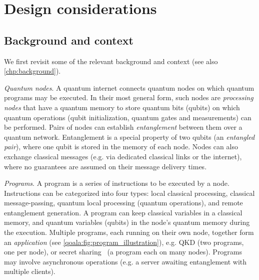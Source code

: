 \section{Design considerations}
\label{qoala:sec:design_considerations}

\subsection{Background and context}
\label{qoala:sec:background_context}

We first revisit some of the relevant background and context (see also \cref{chp:background}).

\textit{Quantum nodes}.
A quantum internet connects quantum nodes on which quantum programs may be 
executed.
In their most general form, such nodes
are \textit{processing nodes} that have a quantum memory to store quantum bits (qubits) on which quantum operations (qubit initialization, quantum gates and measurements) can be performed. Pairs of nodes can establish \textit{entanglement} between them over a quantum network. Entanglement is a special property of two qubits (an \emph{entangled pair}), where one qubit is stored in the memory of each node. Nodes can also exchange classical messages (e.g. via dedicated classical links or the internet), where no guarantees are assumed on their message delivery times. 

\textit{Programs}.
A program is a series of instructions to be executed by a node.
Instructions can be categorized into four types: local classical processing, classical message-passing, quantum local processing (quantum operations), and remote entanglement generation.
A program can keep classical variables in a classical memory, and quantum variables (qubits) in the node's quantum memory during the execution.
Multiple programs, each running on their own node, together form an \textit{application} (see \cref{qoala:fig:program_illustration}), e.g. QKD (two programs, one per node),
or secret sharing~\cite{hillery1999quantum} (a program each on many nodes).
Programs may involve asynchronous operations (e.g. a server awaiting entanglement with multiple clients).

